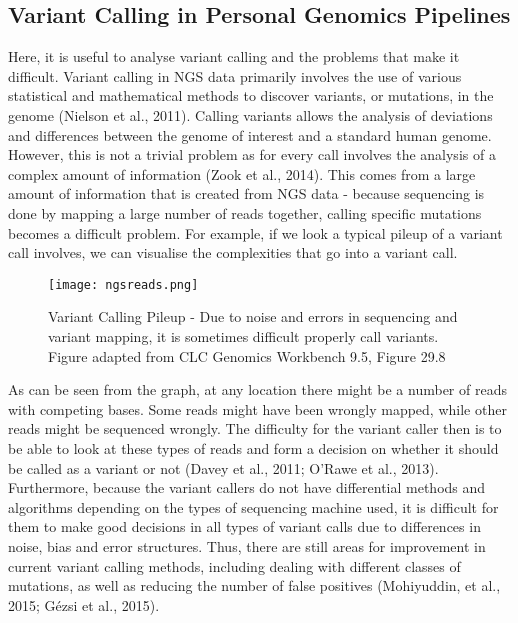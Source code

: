 \documentclass{article}
\begin{document}
\subsection{Variant Calling in Personal Genomics Pipelines}
Here, it is useful to analyse variant calling and the problems that make it difficult. Variant calling in NGS data primarily involves the use of various statistical and mathematical methods to discover variants, or mutations, in the genome (Nielson et al., 2011). Calling variants allows the analysis of deviations and differences between the genome of interest and a standard human genome. However, this is not a trivial problem as for every call involves the analysis of a complex amount of information (Zook et al., 2014). This comes from a large amount of information that is created from NGS data - because sequencing is done by mapping a large number of reads together, calling specific mutations becomes a difficult problem. For example, if we look a typical pileup of a variant call involves, we can visualise the complexities that go into a variant call.
\begin{figure}[H]
\texttt{[image: ngsreads.png]}
\centering
\caption{Variant Calling Pileup - Due to noise and errors in sequencing and variant mapping, it is sometimes difficult properly call variants. Figure adapted from CLC Genomics Workbench 9.5, Figure 29.8}
\end{figure}
As can be seen from the graph, at any location there might be a number of reads with competing bases. Some reads might have been wrongly mapped, while other reads might be sequenced wrongly. The difficulty for the variant caller then is to be able to look at these types of reads and form a decision on whether it should be called as a variant or not (Davey et al., 2011; O'Rawe et al., 2013). Furthermore, because the variant callers do not have differential methods and algorithms depending on the types of sequencing machine used, it is difficult for them to make good decisions in all types of variant calls due to differences in noise, bias and error structures. Thus, there are still areas for improvement in current variant calling methods, including dealing with different classes of mutations, as well as reducing the number of false positives (Mohiyuddin, et al., 2015; Gézsi et al., 2015). \\\\
\end{document}
